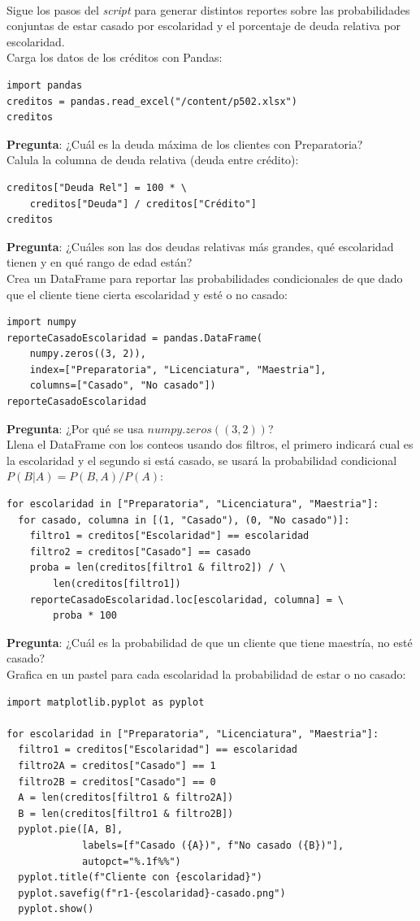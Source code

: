 \documentclass{article}
\begin{document}
\clearpage

\hfill\\
Sigue los pasos del \textit{script} para generar distintos reportes sobre las probabilidades conjuntas de estar casado por escolaridad y el porcentaje de deuda relativa por escolaridad.
\\[12pt]
Carga los datos de los créditos con Pandas:
\begin{verbatim}
import pandas
creditos = pandas.read_excel("/content/p502.xlsx")
creditos
\end{verbatim}
\textbf{Pregunta}: ¿Cuál es la deuda máxima de los clientes con Preparatoria?
\\[12pt]
Calula la columna de deuda relativa (deuda entre crédito):
\begin{verbatim}
creditos["Deuda Rel"] = 100 * \
    creditos["Deuda"] / creditos["Crédito"]
creditos
\end{verbatim}
\textbf{Pregunta}: ¿Cuáles son las dos deudas relativas más grandes, qué escolaridad tienen y en qué rango de edad están?
\\[12pt]
Crea un DataFrame para reportar las probabilidades condicionales de que dado que el cliente tiene cierta escolaridad y esté o no casado:
\begin{verbatim}
import numpy
reporteCasadoEscolaridad = pandas.DataFrame(
    numpy.zeros((3, 2)), 
    index=["Preparatoria", "Licenciatura", "Maestria"], 
    columns=["Casado", "No casado"])
reporteCasadoEscolaridad
\end{verbatim}
\textbf{Pregunta}: ¿Por qué se usa $numpy.zeros((3, 2))$?
\\[12pt]
Llena el DataFrame con los conteos usando dos filtros, el primero indicará cual es la escolaridad y el segundo si está casado, se usará la probabilidad condicional $P(B | A) = P(B, A) / P(A)$:
\begin{verbatim}
for escolaridad in ["Preparatoria", "Licenciatura", "Maestria"]:
  for casado, columna in [(1, "Casado"), (0, "No casado")]:
    filtro1 = creditos["Escolaridad"] == escolaridad
    filtro2 = creditos["Casado"] == casado
    proba = len(creditos[filtro1 & filtro2]) / \
        len(creditos[filtro1])
    reporteCasadoEscolaridad.loc[escolaridad, columna] = \
        proba * 100
\end{verbatim}
\textbf{Pregunta}: ¿Cuál es la probabilidad de que un cliente que tiene maestría, no esté casado?
\\[12pt]
Grafica en un pastel para cada escolaridad la probabilidad de estar o no casado:
\begin{verbatim}
import matplotlib.pyplot as pyplot

for escolaridad in ["Preparatoria", "Licenciatura", "Maestria"]:
  filtro1 = creditos["Escolaridad"] == escolaridad
  filtro2A = creditos["Casado"] == 1
  filtro2B = creditos["Casado"] == 0
  A = len(creditos[filtro1 & filtro2A])
  B = len(creditos[filtro1 & filtro2B])
  pyplot.pie([A, B], 
             labels=[f"Casado ({A})", f"No casado ({B})"],
             autopct="%.1f%%")
  pyplot.title(f"Cliente con {escolaridad}")
  pyplot.savefig(f"r1-{escolaridad}-casado.png")
  pyplot.show()
\end{verbatim}
\end{document}
